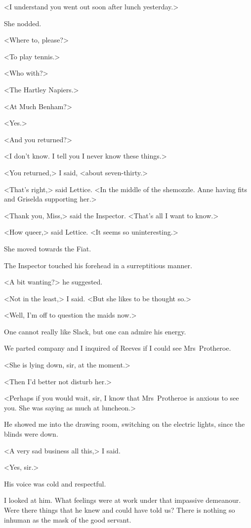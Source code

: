 <I understand you went out soon after lunch yesterday.>

She nodded.

<Where to, please?>

<To play tennis.>

<Who with?>

<The Hartley Napiers.>

<At Much Benham?>

<Yes.>

<And you returned?>

<I don't know. I tell you I never know these things.>

<You returned,> I said, <about seven-thirty.>

<That's right,> said Lettice. <In the middle of the shemozzle. Anne having fits and Griselda supporting her.>

<Thank you, Miss,> said the Inspector. <That's all I want to know.>

<How queer,> said Lettice. <It seems so uninteresting.>

She moved towards the Fiat.

The Inspector touched his forehead in a surreptitious manner.

<A bit wanting?> he suggested.

<Not in the least,> I said. <But she likes to be thought so.>

<Well, I'm off to question the maids now.>

One cannot really like Slack, but one can admire his energy.

We parted company and I inquired of Reeves if I could see Mrs~Protheroe.

<She is lying down, sir, at the moment.>

<Then I'd better not disturb her.>

<Perhaps if you would wait, sir, I know that Mrs~Protheroe is anxious to see you. She was saying as much at luncheon.>

He showed me into the drawing room, switching on the electric lights, since the blinds were down.

<A very sad business all this,> I said.

<Yes, sir.>

His voice was cold and respectful.

I looked at him. What feelings were at work under that impassive demeanour. Were there things that he knew and could have told us? There is nothing so inhuman as the mask of the good servant.

